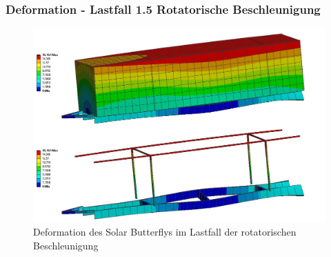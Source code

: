 \subsubsection{Deformation - Lastfall 1.5 Rotatorische Beschleunigung}
\begin{figure}[H]
  \centering
  \includegraphics[width=1\linewidth]{04_figures/FEM 1.5.png}
  \caption{Deformation des Solar Butterflys im Lastfall der rotatorischen Beschleunigung}
  \label{FEM 1.5}
\end{figure}
\newpage

